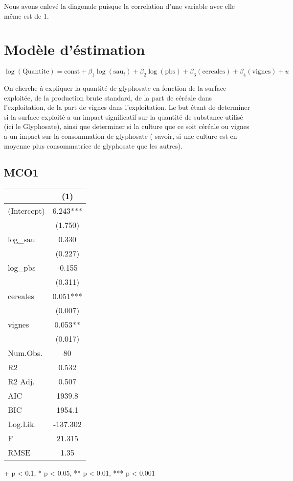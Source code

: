 \documentclass[
]{article}
\begin{document}
Nous avons enlevé la diagonale puisque la correlation d'une variable
avec elle même est de 1.

\section{Modèle d'éstimation}\label{moduxe8le-duxe9stimation}

\[\log(\text{Quantite}) = \text{const} + \beta_1 \log(\text{sau}_i) + \beta_2 \log(\text{pbs}) + \beta_3 (\text{cereales}) + \beta_4 (\text{vignes}) + u\]

On cherche à expliquer la quantité de glyphosate en fonction de la
surface exploitée, de la production brute standard, de la part de
céréale dans l'exploitation, de la part de vignes dans l'exploitation.
Le but étant de determiner si la surface exploité a un impact
significatif sur la quantité de substance utilisé (ici le Glyphosate),
ainsi que determiner si la culture que ce soit céréale ou vignes a un
impact sur la consommation de glyphosate ( savoir, si une culture est en
moyenne plus consommatrice de glyphosate que les autres).

\subsection{MCO1}\label{mco1}

\begin{table}[!t]
\fontsize{12.0pt}{14.4pt}\selectfont
\begin{tabular*}{\linewidth}{@{\extracolsep{\fill}}lc}
\toprule
  & (1) \\ 
\midrule\addlinespace[2.5pt]
(Intercept) & 6.243*** \\ 
 & (1.750) \\ 
log\_sau & 0.330 \\ 
 & (0.227) \\ 
log\_pbs & -0.155 \\ 
 & (0.311) \\ 
cereales & 0.051*** \\ 
 & (0.007) \\ 
vignes & 0.053** \\ 
{} & {(0.017)} \\ 
Num.Obs. & 80 \\ 
R2 & 0.532 \\ 
R2 Adj. & 0.507 \\ 
AIC & 1939.8 \\ 
BIC & 1954.1 \\ 
Log.Lik. & -137.302 \\ 
F & 21.315 \\ 
RMSE & 1.35 \\ 
\bottomrule
\end{tabular*}
\begin{minipage}{\linewidth}
+ p < 0.1, * p < 0.05, ** p < 0.01, *** p < 0.001\\
\end{minipage}
\end{table}
\end{document}
